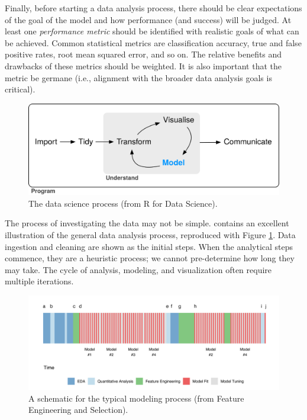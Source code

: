 \documentclass[11pt]{book}
\begin{document}
Finally, before starting a data analysis process, there should be clear expectations of the goal of the model and how performance (and success) will be judged. At least one \emph{performance metric} should be identified with realistic goals of what can be achieved. Common statistical metrics are classification accuracy, true and false positive rates, root mean squared error, and so on. The relative benefits and drawbacks of these metrics should be weighted. It is also important that the metric be germane (i.e., alignment with the broader data analysis goals is critical).

\begin{figure}

{\centering \includegraphics[width=0.8\linewidth]{figures-premade/data-science-model} 

}

\caption{The data science process (from R for Data Science).}\label{fig:data-science-model}
\end{figure}

The process of investigating the data may not be simple. \citet{wickham2016} contains an excellent illustration of the general data analysis process, reproduced with Figure \ref{fig:data-science-model}. Data ingestion and cleaning are shown as the initial steps. When the analytical steps commence, they are a heuristic process; we cannot pre-determine how long they may take. The cycle of analysis, modeling, and visualization often require multiple iterations.

\begin{figure}

{\centering \includegraphics[width=1\linewidth]{figures/introduction-modeling-process-1} 

}

\caption{A schematic for the typical modeling process (from Feature Engineering and Selection).}\label{fig:modeling-process}
\end{figure}
\end{document}
